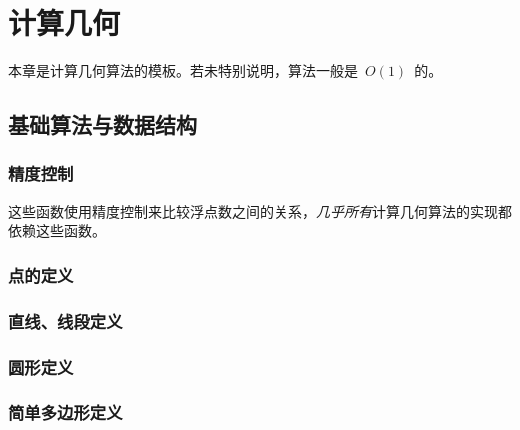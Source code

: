 \chapter{计算几何}

本章是计算几何算法的模板。若未特别说明，算法一般是~$O(1)$~的。


\section{基础算法与数据结构}

\subsection{精度控制}
\label{cgeom:precision}

这些函数使用精度控制来比较浮点数之间的关系，\emph{几乎所有}计算几何算法的实现都依赖这些函数。





\subsection{点的定义}
\label{cgeom:pointdef}



\subsection{直线、线段定义}



\subsection{圆形定义}



\subsection{简单多边形定义}


